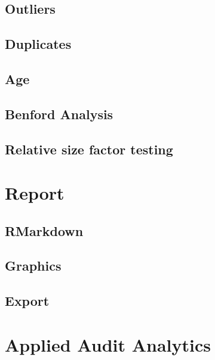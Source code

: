 \documentclass[
]{book}
\begin{document}
\hypertarget{outliers}{%
\section{Outliers}\label{outliers}}

\hypertarget{duplicates}{%
\section{Duplicates}\label{duplicates}}

\hypertarget{age}{%
\section{Age}\label{age}}

\hypertarget{benford-analysis}{%
\section{Benford Analysis}\label{benford-analysis}}

\hypertarget{relative-size-factor-testing}{%
\section{Relative size factor testing}\label{relative-size-factor-testing}}

\hypertarget{report}{%
\chapter{Report}\label{report}}

\hypertarget{rmarkdown}{%
\section{RMarkdown}\label{rmarkdown}}

\hypertarget{graphics}{%
\section{Graphics}\label{graphics}}

\hypertarget{export}{%
\section{Export}\label{export}}

\hypertarget{applied-audit-analytics}{%
\chapter{Applied Audit Analytics}\label{applied-audit-analytics}}
\end{document}
